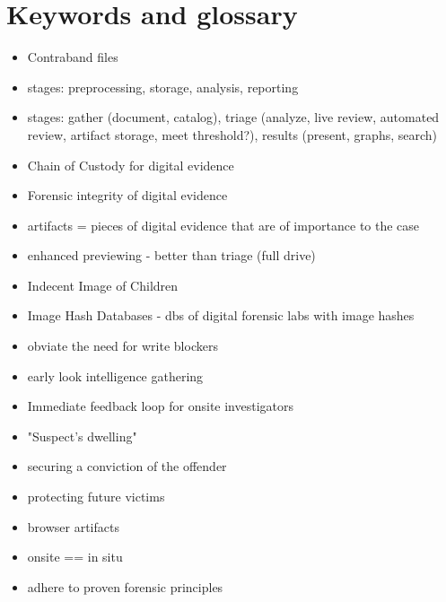 \documentclass[12pt]{article}
\begin{document}
\section{Keywords and glossary}
\begin{itemize}
  \item Contraband files
  \item stages: preprocessing, storage, analysis, reporting
  \item stages: gather (document, catalog), triage (analyze, live review, automated review, artifact storage,
  meet threshold?), results (present, graphs, search)
  \item Chain of Custody for digital evidence
  \item Forensic integrity of digital evidence
  \item artifacts = pieces of digital evidence that are of importance to the case
  \item enhanced previewing - better than triage (full drive)
  \item Indecent Image of Children
  \item Image Hash Databases - dbs of digital forensic labs with image hashes
  \item obviate the need for write blockers
  \item early look intelligence gathering
  \item Immediate feedback loop for onsite investigators
  \item "Suspect's dwelling"
  \item securing a conviction of the offender
  \item protecting future victims
  \item browser artifacts
  \item onsite == in situ
  \item adhere to proven forensic principles
\end{itemize}

\newpage
\end{document}
